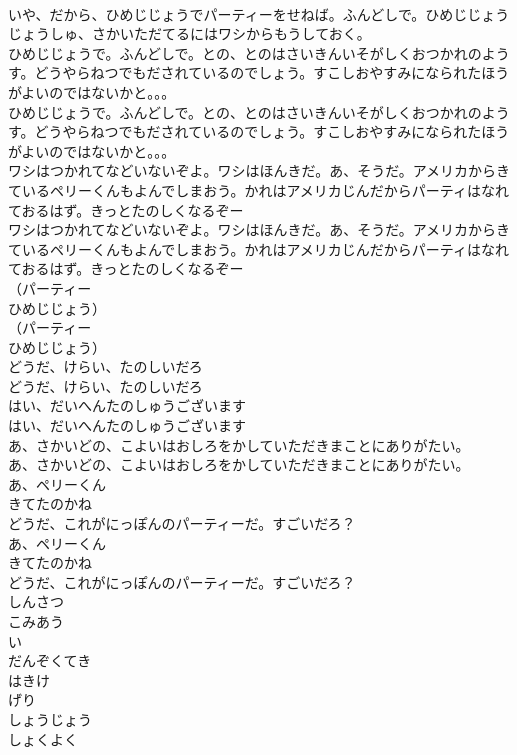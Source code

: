 \documentclass[8pt]{extreport}
\begin{document}
\begin{CJK}{UTF8}{min}
\\	いや、だから、ひめじじょうでパーティーをせねば。ふんどしで。ひめじじょうじょうしゅ、さかいただてるにはワシからもうしておく。
\\	ひめじじょうで。ふんどしで。との、とのはさいきんいそがしくおつかれのようす。どうやらねつでもだされているのでしょう。すこしおやすみになられたほうがよいのではないかと。。。
\\	ひめじじょうで。ふんどしで。との、とのはさいきんいそがしくおつかれのようす。どうやらねつでもだされているのでしょう。すこしおやすみになられたほうがよいのではないかと。。。
\\	ワシはつかれてなどいないぞよ。ワシはほんきだ。あ、そうだ。アメリカからきているペリーくんもよんでしまおう。かれはアメリカじんだからパーティはなれておるはず。きっとたのしくなるぞー
\\	ワシはつかれてなどいないぞよ。ワシはほんきだ。あ、そうだ。アメリカからきているペリーくんもよんでしまおう。かれはアメリカじんだからパーティはなれておるはず。きっとたのしくなるぞー
\\	（パーティー 
\\	ひめじじょう）
\\	（パーティー 
\\	ひめじじょう）
\\	どうだ、けらい、たのしいだろ
\\	どうだ、けらい、たのしいだろ
\\	はい、だいへんたのしゅうございます
\\	はい、だいへんたのしゅうございます
\\	あ、さかいどの、こよいはおしろをかしていただきまことにありがたい。
\\	あ、さかいどの、こよいはおしろをかしていただきまことにありがたい。
\\	あ、ペリーくん
\\	きてたのかね
\\	どうだ、これがにっぽんのパーティーだ。すごいだろ？
\\	あ、ペリーくん
\\	きてたのかね
\\	どうだ、これがにっぽんのパーティーだ。すごいだろ？
\\	しんさつ
\\	こみあう
\\	い
\\	だんぞくてき
\\	はきけ
\\	げり
\\	しょうじょう
\\	しょくよく

\end{CJK}
\end{document}
